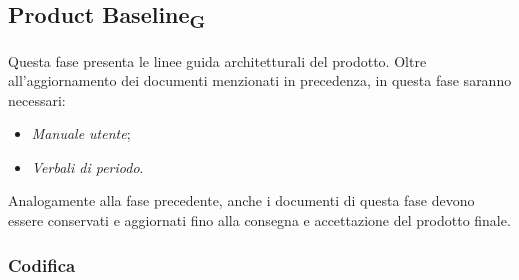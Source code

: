 \documentclass{article}
\begin{document}
\subsection*{Product Baseline\textsubscript{G}}
Questa fase presenta le linee guida architetturali del prodotto. Oltre all'aggiornamento dei documenti menzionati in precedenza, in questa fase saranno necessari:
\begin{itemize}
    \item \textit{Manuale utente};
    \item \textit{Verbali di periodo}.
\end{itemize}
Analogamente alla fase precedente, anche i documenti di questa fase devono essere conservati e aggiornati fino alla consegna e accettazione del prodotto finale.
\subsubsection{Codifica}
\end{document}
